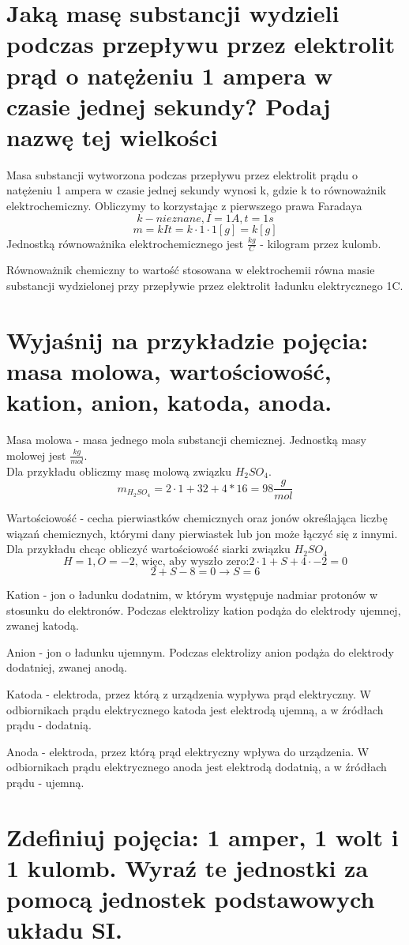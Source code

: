 \documentclass[a4paper,11pt]{article} %
\begin{document}
\section{Jaką masę substancji wydzieli podczas przepływu przez elektrolit prąd
o natężeniu 1 ampera w czasie jednej sekundy? Podaj nazwę tej wielkości}
Masa substancji wytworzona podczas przepływu przez elektrolit prądu o natężeniu 1 ampera w czasie jednej sekundy wynosi k, gdzie k to równoważnik elektrochemiczny.
Obliczymy to korzystając z pierwszego prawa Faradaya
$$ k- nieznane, I = 1A, t = 1s$$
$$ m = kIt = k \cdot 1 \cdot 1 [g] = k [g] $$
Jednostką równoważnika elektrochemicznego jest $\frac{kg}{C}$ - kilogram przez kulomb.

Równoważnik chemiczny to wartość stosowana w elektrochemii równa masie substancji wydzielonej przy przepływie przez elektrolit ładunku elektrycznego 1C.
\section{Wyjaśnij na przykładzie pojęcia: masa molowa, wartościowość, kation,
anion, katoda, anoda.}
Masa molowa - masa jednego mola substancji chemicznej. Jednostką masy molowej jest $\frac{kg}{mol}$.\\
Dla przykładu obliczmy masę molową związku $H_2SO_4$. 
$$m_{H_2SO_4} = 2 \cdot 1 + 32 + 4*16 = 98 \frac{g}{mol}$$

Wartościowość - cecha pierwiastków chemicznych oraz jonów określająca liczbę wiązań chemicznych, którymi dany pierwiastek lub jon może łączyć się z innymi.
Dla przykładu chcąc obliczyć wartościowość siarki związku $H_2SO_4$
$$H=1, O=-2\text{, więc, aby wyszło zero:} 2\cdot 1 + S + 4\cdot -2 = 0$$
$$ 2 + S - 8 = 0 \rightarrow S = 6 $$

Kation - jon o ładunku dodatnim, w którym występuje nadmiar protonów w stosunku do elektronów. Podczas elektrolizy kation podąża do elektrody ujemnej, zwanej katodą.

Anion - jon o ładunku ujemnym. Podczas elektrolizy anion podąża do elektrody dodatniej, zwanej anodą.

Katoda - elektroda, przez którą z urządzenia wypływa prąd elektryczny. W odbiornikach prądu elektrycznego katoda jest elektrodą ujemną, a w źródłach prądu - dodatnią.

Anoda - elektroda, przez którą prąd elektryczny wpływa do urządzenia. W odbiornikach prądu elektrycznego anoda jest elektrodą dodatnią, a w źródłach prądu - ujemną.

\section{Zdefiniuj pojęcia: 1 amper, 1 wolt i 1 kulomb. Wyraź te jednostki za
pomocą jednostek podstawowych układu SI.}
\end{document}
